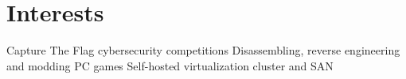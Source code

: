 \documentclass[]{illustris-resume-openfont}
\begin{document}
\begin{minipage}[t]{0.66\textwidth}
\section{Interests}
Capture The Flag cybersecurity competitions \textbullet{} Disassembling, reverse engineering and modding PC games \textbullet{} Self-hosted virtualization cluster and SAN
\sectionsep

\end{minipage} 
\end{document}
